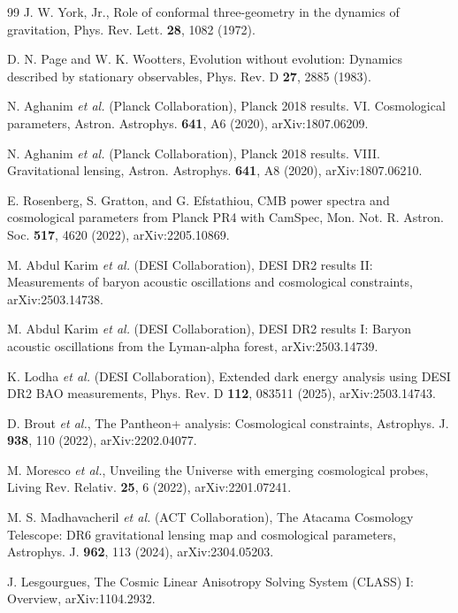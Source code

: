 \documentclass[
  aps,
  prd,
  reprint,
  superscriptaddress,
  nofootinbib,
  floatfix,
  longbibliography
]{revtex4-2}
\begin{document}
\begin{thebibliography}{99}
J. W. York, Jr., Role of conformal three-geometry in the dynamics of gravitation, Phys. Rev. Lett. \textbf{28}, 1082 (1972).

D. N. Page and W. K. Wootters, Evolution without evolution: Dynamics described by stationary observables, Phys. Rev. D \textbf{27}, 2885 (1983).

N. Aghanim \textit{et al.} (Planck Collaboration), Planck 2018 results. VI. Cosmological parameters, Astron. Astrophys. \textbf{641}, A6 (2020), arXiv:1807.06209.

N. Aghanim \textit{et al.} (Planck Collaboration), Planck 2018 results. VIII. Gravitational lensing, Astron. Astrophys. \textbf{641}, A8 (2020), arXiv:1807.06210.

E. Rosenberg, S. Gratton, and G. Efstathiou, CMB power spectra and cosmological parameters from Planck PR4 with CamSpec, Mon. Not. R. Astron. Soc. \textbf{517}, 4620 (2022), arXiv:2205.10869.

M. Abdul Karim \textit{et al.} (DESI Collaboration), DESI DR2 results II: Measurements of baryon acoustic oscillations and cosmological constraints, arXiv:2503.14738.

M. Abdul Karim \textit{et al.} (DESI Collaboration), DESI DR2 results I: Baryon acoustic oscillations from the Lyman-alpha forest, arXiv:2503.14739.

K. Lodha \textit{et al.} (DESI Collaboration), Extended dark energy analysis using DESI DR2 BAO measurements, Phys. Rev. D \textbf{112}, 083511 (2025), arXiv:2503.14743.

D. Brout \textit{et al.}, The Pantheon+ analysis: Cosmological constraints, Astrophys. J. \textbf{938}, 110 (2022), arXiv:2202.04077.

M. Moresco \textit{et al.}, Unveiling the Universe with emerging cosmological probes, Living Rev. Relativ. \textbf{25}, 6 (2022), arXiv:2201.07241.

M. S. Madhavacheril \textit{et al.} (ACT Collaboration), The Atacama Cosmology Telescope: DR6 gravitational lensing map and cosmological parameters, Astrophys. J. \textbf{962}, 113 (2024), arXiv:2304.05203.

J. Lesgourgues, The Cosmic Linear Anisotropy Solving System (CLASS) I: Overview, arXiv:1104.2932.


\end{thebibliography}
\end{document}
